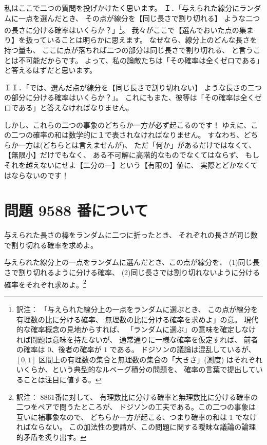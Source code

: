 \documentclass{article}
\begin{document}
 私はここで二つの質問を投げかけたく思います。
Ｉ．「与えられた線分にランダムに一点を選んだとき、
その点が線分を【同じ長さで割り切れる】
ような二つの長さに分ける確率はいくらか？」\footnote{訳注：
「与えられた線分上の一点をランダムに選ぶとき、
この点が線分を有理数の比に分ける確率、
無理数の比に分ける確率を求めよ」の意。
現代的な確率概念の見地からすれば、
「ランダムに選ぶ」の意味を確定しなければ問題は意味を持たないが、
通常通りに一様な確率を仮定すれば、
前者の確率は $0$、後者の確率が $1$ である。
ドジソンの議論は混乱しているが、
$[0, 1]$ 区間上の有理数の集合と無理数の集合の「大きさ」(測度)
はそれぞれいくらか、という典型的なルベーグ積分の問題を、
確率の言葉で提出していることは注目に値する。}。
我々がここで【選んでおいた点の集まり】を扱っていることは明らかに思えます。
なぜなら、線分上のどんな長さを持つ量も、
ここに点が落ちれば二つの部分は同じ長さで割り切れる、
と言うことは不可能だからです。
よって、私の論敵たちは「その確率は全くゼロである」と答えるはずだと思います。

ＩＩ．「では、選んだ点が線分を【同じ長さで割り切れない】
ような長さの二つの部分に分ける確率はいくらか？」。
これにもまた、彼等は「その確率は全くゼロである」と答えなければなりません。

 しかし、これらの二つの事象のどちらか一方が必ず起こるのです！
ゆえに、この二つの確率の和は数学的に１で表されなければなりません。
すなわち、どちらか一方は(どちらとは言えませんが)、
ただ「何か」があるだけではなくて、【無限小】だけでもなく、
ある不可解に高階的なものでなくてはならず、
もしそれを越えないにせよ【二分の一】という【有限の】値に、
実際とどかなくてはならないのです！

\section*{問題 9588 番について}

\begin{prob}[{\bf 8861}番 J.Brill, M.A. 出題]
与えられた長さの棒をランダムに二つに折ったとき、
それぞれの長さが同じ数で割り切れる確率を求めよ。
\end{prob}

\begin{prob}
与えられた線分上の一点をランダムに選んだとき、この点が線分を、
(1)同じ長さで割り切れるように分ける確率、
(2)同じ長さでは割り切れないように分ける確率をそれぞれ求めよ。\footnote{訳注：
8861番に対して、
有理数比に分ける確率と無理数比に分ける確率の二つをペアで問うたところが、
ドジソンの工夫である。この二つの事象は互いに補事象なので、
どちらか一方が起こる、つまり確率の和は 1 でなければならない。
この加法性の要請が、この問題に関する曖昧な議論の論理的矛盾を炙り出す。}
\end{prob}
\end{document}
